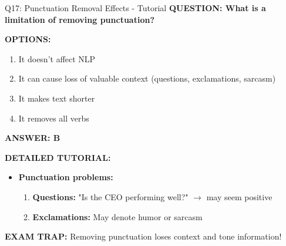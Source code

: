 \documentclass[8pt]{beamer}
\begin{document}
	\begin{frame}{Q17: Punctuation Removal Effects - Tutorial}
		\fontsize{6.5}{7.5}\selectfont
		\textbf{QUESTION: What is a limitation of removing punctuation?}
		
		\vspace{0.1cm}
		\textbf{OPTIONS:}
		\begin{enumerate}
			\item It doesn't affect NLP
			\item It can cause loss of valuable context (questions, exclamations, sarcasm)
			\item It makes text shorter
			\item It removes all verbs
		\end{enumerate}
		
		\vspace{0.1cm}
		\textcolor{myblue}{\textbf{ANSWER: B}}
		
		\vspace{0.1cm}
		\textbf{DETAILED TUTORIAL:}
		\begin{itemize}
			\item \textbf{Punctuation problems:}
			\begin{enumerate}
				\item \textbf{Questions:} "Is the CEO performing well?" $\to$ may seem positive
				\item \textbf{Exclamations:} May denote humor or sarcasm
			\end{enumerate}
		\end{itemize}
		
		\textcolor{myred}{\textbf{EXAM TRAP:}} Removing punctuation loses \textcolor{myblue}{context and tone} information!
	\end{frame}
	
\end{document}
